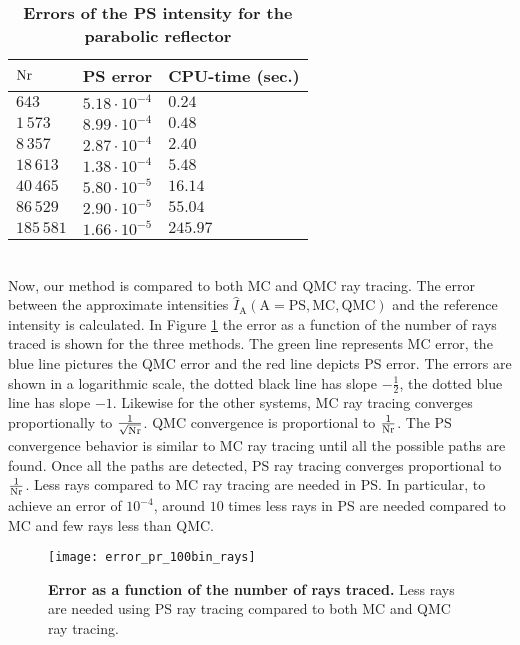 \begin{table}[ht] \label{tab:table_pr_triangulation}
\centering
\caption{\bf Errors of the PS intensity for the parabolic reflector}
\begin{tabular}{lll}
 \hline   $\textrm{Nr}$ & PS error & CPU-time (sec.) \\
  \hline 
 $643$        & $5.18\cdot10^{-4}$ & $0.24$\\
 $1\,573$       & $8.99\cdot 10^{-4}$ & $0.48$\\
 $8\,357$     & $2.87\cdot 10^{-4}$ & $2.40$ \\
 $18\,613$     & $1.38\cdot 10^{-4}$ & $5.48$\\
 $40\,465$   & $5.80\cdot 10^{-5}$ & $16.14$\\
 $86\,529$    & $2.90\cdot 10^{-5}$ & $55.04$\\
 $185\,581$   & $1.66\cdot 10^{-5}$ & $245.97$\\
 \hline
 \end{tabular}
 \end{table}
\\ \indent 
Now, our method is compared to both MC and QMC ray tracing. 
The error between the approximate intensities $\hat{I}_{\textrm{A}}(\textrm{A}=\textrm{PS}, \textrm{MC}, \textrm{QMC})$ and the reference intensity is calculated. In Figure \ref{fig:error_rays_pr} the error as a function of the number of rays traced is shown for the three methods.
The green line represents MC error, the blue line pictures the QMC error and the red line depicts PS error. The errors are shown in a logarithmic scale, the dotted black line has slope $-\frac{1}{2}$, the dotted blue line has slope $-1$. Likewise for the other systems, MC ray tracing converges proportionally to $\frac{1}{\sqrt{\textrm{Nr}}}$. QMC convergence is proportional to $\frac{1}{\textrm{Nr}}$. The PS convergence behavior is similar to MC ray tracing until all the possible paths are found. Once all the paths are detected, PS ray tracing converges proportional to $\frac{1}{\textrm{Nr}}$. Less rays compared to MC ray tracing are needed in PS. In particular, to achieve an error of $10^{-4}$, around $10$ times less rays in PS are needed compared to MC and few rays less than QMC.
\begin{figure}[h!]
  \center
  \texttt{[image: error\_pr\_100bin\_rays]}
  \caption{\textbf{Error as a function of the number of rays traced.} Less rays are needed using PS ray tracing compared to both MC and QMC ray tracing.}
  \label{fig:error_rays_pr}
\end{figure} 
